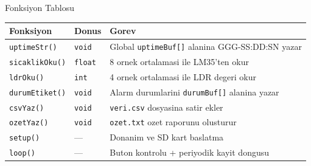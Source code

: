 \begin{frame}{Fonksiyon Tablosu}
  \begin{center}
  \small
  \begin{tabular}{|l|l|p{5.5cm}|}
    \hline
    \rowcolor{black}\color{white}\textbf{Fonksiyon} &
    \color{white}\textbf{Donus} &
    \color{white}\textbf{Gorev} \\
    \hline
    \texttt{uptimeStr()} & \texttt{void} &
      Global \texttt{uptimeBuf[]} alanina GGG-SS:DD:SN yazar \\
    \hline
    \rowcolor{gray!15}
    \texttt{sicaklikOku()} & \texttt{float} &
      8 ornek ortalamasi ile LM35'ten \textcelsius{} okur \\
    \hline
    \texttt{ldrOku()} & \texttt{int} &
      4 ornek ortalamasi ile LDR degeri okur \\
    \hline
    \rowcolor{gray!15}
    \texttt{durumEtiket()} & \texttt{void} &
      Alarm durumlarini \texttt{durumBuf[]} alanina yazar \\
    \hline
    \texttt{csvYaz()} & \texttt{void} &
      \texttt{veri.csv} dosyasina satir ekler \\
    \hline
    \rowcolor{gray!15}
    \texttt{ozetYaz()} & \texttt{void} &
      \texttt{ozet.txt} ozet raporunu olusturur \\
    \hline
    \texttt{setup()} & --- &
      Donanim ve SD kart baslatma \\
    \hline
    \rowcolor{gray!15}
    \texttt{loop()} & --- &
      Buton kontrolu + periyodik kayit dongusu \\
    \hline
  \end{tabular}
  \end{center}
\end{frame}
